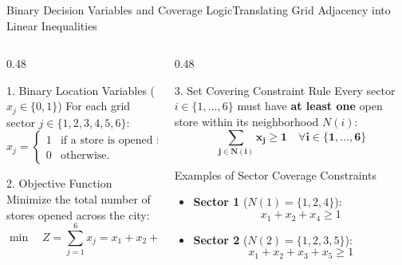 \documentclass[aspectratio=169]{beamer}
\begin{document}
\begin{frame}{Binary Decision Variables and Coverage Logic}{Translating Grid Adjacency into Linear Inequalities}
\begin{columns}[T,onlytextwidth]
\begin{column}{0.48\textwidth}
  \begin{block}{1. Binary Location Variables ($x_j \in \{0,1\}$)}
    \scriptsize
    For each grid sector $j \in \{1, 2, 3, 4, 5, 6\}$:
    \[
      x_j = \begin{cases}
        1 & \text{if a store is opened in Sector } j, \\
        0 & \text{otherwise.}
      \end{cases}
    \]
  \end{block}
  \begin{block}{2. Objective Function}
    \scriptsize
    Minimize the total number of stores opened across the city:
    \[
      \min \quad Z = \sum_{j=1}^6 x_j = x_1 + x_2 + x_3 + x_4 + x_5 + x_6
    \]
  \end{block}
\end{column}
\begin{column}{0.48\textwidth}
  \begin{alertblock}{3. Set Covering Constraint Rule}
    \scriptsize
    Every sector $i \in \{1,\dots,6\}$ must have \textbf{at least one} open store within its neighborhood $N(i)$:
    \[
      \mathbf{\sum_{j \in N(i)} x_j \ge 1 \quad \forall i \in \{1,\dots,6\}}
    \]
  \end{alertblock}
  \begin{exampleblock}{Examples of Sector Coverage Constraints}
    \scriptsize
    \begin{itemize}\setlength{\itemsep}{2pt}
      \item \textbf{Sector 1} ($N(1) = \{1, 2, 4\}$):
        \[
          x_1 + x_2 + x_4 \ge 1
        \]
      \item \textbf{Sector 2} ($N(2) = \{1, 2, 3, 5\}$):
        \[
          x_1 + x_2 + x_3 + x_5 \ge 1
        \]
    \end{itemize}
  \end{exampleblock}
\end{column}
\end{columns}
\end{frame}
\end{document}
